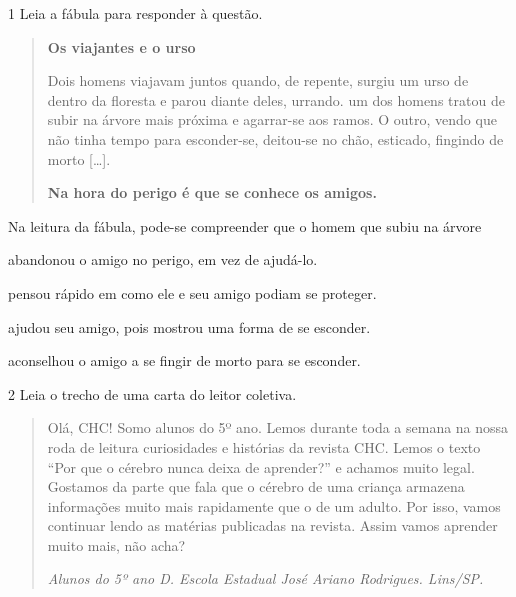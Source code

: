 \num{1} Leia a fábula para responder à questão.

\begin{quote}
\textbf{Os viajantes e o urso}

Dois homens viajavam juntos quando, de repente, surgiu um urso de dentro
da floresta e parou diante deles, urrando. um dos homens tratou de subir
na árvore mais próxima e agarrar-se aos ramos. O outro, vendo que não
tinha tempo para esconder-se, deitou-se no chão, esticado, fingindo de
morto {[}\ldots{}{]}.

\textbf{Na hora do perigo é que se conhece os amigos.}

\end{quote}

Na leitura da fábula, pode-se compreender que o homem que subiu na árvore

\begin{escolha}
\item abandonou o amigo no perigo, em vez de ajudá-lo.

\item pensou rápido em como ele e seu amigo podiam se proteger.

\item ajudou seu amigo, pois mostrou uma forma de se esconder.

\item aconselhou o amigo a se fingir de morto para se esconder.
\end{escolha}


\enlargethispage{\baselineskip}
\num{2} Leia o trecho de uma carta do leitor coletiva.

\begin{quote}
Olá, CHC! Somo alunos do 5º ano. Lemos durante toda a semana na nossa
roda de leitura curiosidades e histórias da revista CHC. Lemos o texto
``Por que o cérebro nunca deixa de aprender?'' e achamos muito legal.
Gostamos da parte que fala que o cérebro de uma criança armazena
informações muito mais rapidamente que o de um adulto. Por isso, vamos
continuar lendo as matérias publicadas na revista. Assim vamos aprender
muito mais, não acha?

\begin{flushleft}
\textit{Alunos do 5º ano D. Escola Estadual José Ariano Rodrigues. Lins/SP.}
\end{flushleft}

\end{quote}


